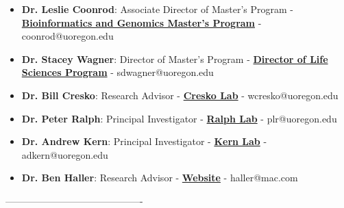\documentclass[letterpaper,11pt]{article}
\let\oldhref\href
\renewcommand{\href}[2]{\oldhref{#1}{\bfseries#2}}
\newcommand{\resumeItem}[2]{
  \item\small{
    \textbf{#1}{: #2 \vspace{-2pt}}
  }
}
\newcommand{\resumeSubItem}[2]{\resumeItem{#1}{#2}\vspace{-4pt}}
\newcommand{\resumeSubHeadingListStart}{\begin{itemize}[leftmargin=*]}
\newcommand{\resumeSubHeadingListEnd}{\end{itemize}}
\begin{document}
\resumeSubHeadingListStart
    \resumeSubItem {Dr. Leslie Coonrod}
        {Associate Director of Master's Program -
        \href{https://accelerate.uoregon.edu/leslie-coonrod}
        {Bioinformatics and Genomics Master's Program} -
        coonrod@uoregon.edu}
    \resumeSubItem {Dr. Stacey Wagner}
        {Director of Master's Program -
        \href{https://accelerate.uoregon.edu/stacey-wagner}
        {Director of Life Sciences Program} - 
        sdwagner@uoregon.edu}
    \resumeSubItem {Dr. Bill Cresko}
        {Research Advisor -
        \href{https://creskolab.uoregon.edu/}
        {Cresko Lab} - 
        wcresko@uoregon.edu}
    \resumeSubItem {Dr. Peter Ralph}
        {Principal Investigator -
        \href{https://pages.uoregon.edu/plr/}
        {Ralph Lab} - 
        plr@uoregon.edu}
    \resumeSubItem {Dr. Andrew Kern}
        {Principal Investigator -
        \href{http://www.kernlab.org/} 
        {Kern Lab} -
        adkern@uoregon.edu}
    \resumeSubItem {Dr. Ben Haller}
        {Research Advisor - 
        \href{http://benhaller.com/}
        {Website} - 
        haller@mac.com}
\resumeSubHeadingListEnd

-------------------------------------------
\end{document}
